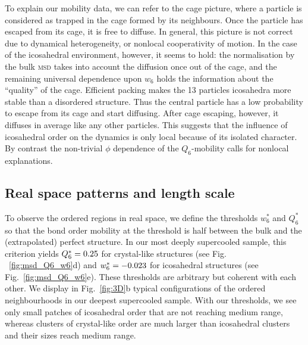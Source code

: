 To explain our mobility data, we can refer to the cage picture, where a particle is considered as trapped in the cage formed by its neighbours. Once the particle has escaped from its cage, it is free to diffuse. In general, this picture is not correct due to dynamical heterogeneity, or nonlocal cooperativity of motion. In the case of the icosahedral environment, however, it seems to hold: the normalisation by the bulk \textsc{msd} takes into account the diffusion once out of the cage, and the remaining universal dependence upon $w_6$ holds the information about the ``quality'' of the cage. Efficient packing makes the 13 particles icosahedra more stable than a disordered structure. Thus the central particle has a low probability to escape from its cage and start diffusing. After cage escaping, however, it diffuses in average like any other particles. This suggests that the influence of icosahedral order on the dynamics is only local because of its isolated character. By contrast the non-trivial $\phi$ dependence of the $Q_6$-mobility calls for nonlocal explanations.

\subsection*{Real space patterns and length scale}
To observe the ordered regions in real space, we define the thresholds $w_6^*$ and $Q_6^*$ so that the bond order mobility at the threshold is half between the bulk and the (extrapolated) perfect structure. In our most deeply supercooled sample, this criterion yields $Q_6^* = 0.25$ for crystal-like structures (see Fig. ~\ref{fig:msd_Q6_w6}d) and $w_6^* = -0.023$ for icosahedral structures (see Fig.~\ref{fig:msd_Q6_w6}e). These thresholds are arbitrary but coherent with each other. We display in Fig.~\ref{fig:3D}b typical configurations of the ordered neighbourhoods in our deepest supercooled sample. With our thresholds, we see only small patches of icosahedral order that are not reaching medium range, whereas clusters of crystal-like order are much larger than icosahedral clusters and their sizes reach medium range. 

